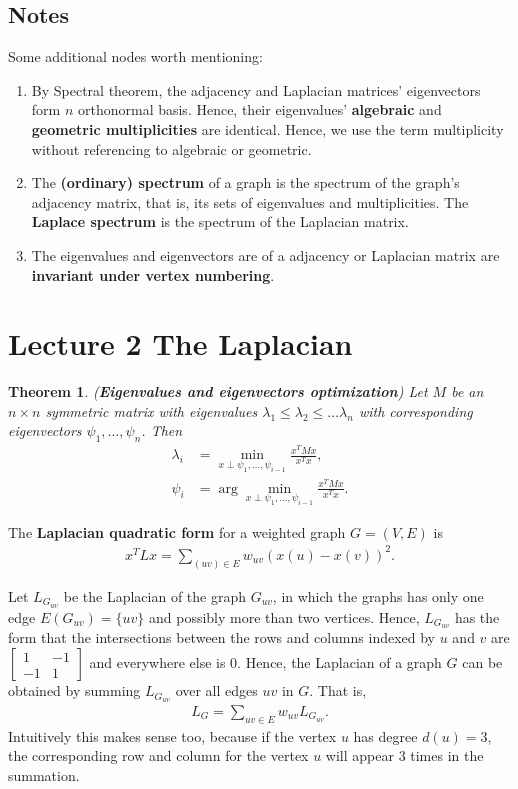 \documentclass[]{article}
\newtheorem{theorem}{Theorem}[section]
\begin{document}
	\subsection{Notes}
	Some additional nodes worth mentioning: 
	
	\begin{enumerate}
		\item By Spectral theorem, the adjacency and Laplacian matrices' eigenvectors form $n$ orthonormal basis. Hence, their eigenvalues' \textbf{algebraic} and \textbf{geometric multiplicities} are identical. Hence, we use the term multiplicity without referencing to algebraic or geometric. 
		\item The \textbf{(ordinary) spectrum} of a graph is the spectrum of the graph's adjacency matrix, that is, its sets of eigenvalues and multiplicities. The \textbf{Laplace spectrum} is the spectrum of the Laplacian matrix. 
		\item The eigenvalues and eigenvectors are of a adjacency or Laplacian matrix are \textbf{invariant under vertex numbering}. 
	\end{enumerate}
	
	\section{Lecture 2 The Laplacian}
	
	\begin{theorem} (\textbf{Eigenvalues and eigenvectors optimization})
		Let $M$ be an $n \times n$ symmetric matrix with eigenvalues $\lambda_1 \le \lambda_2 \le \dots \lambda_n$ with corresponding eigenvectors $\psi_1, \dots, \psi_n$. Then 
		\begin{align*}
		\lambda_i &= \min_{x \perp \psi_1, \dots, \psi_{i-1}} \frac{x^T M x}{x^T x}, \\
		\psi_i &= \arg\min_{x \perp \psi_1, \dots, \psi_{i-1}} \frac{x^T M x}{x^T x}.
		\end{align*}
	\end{theorem}
	
	The \textbf{Laplacian quadratic form} for a weighted graph $G=(V,E)$ is 
	\begin{align}
	\label{equation:laplacian quadratic form}
	x^T L x = \sum_{(uv) \in E} w_{uv} (x(u) - x(v))^2.
	\end{align}
	
	Let $L_{G_{uv}}$ be the Laplacian of the graph $G_{uv}$, in which the graphs has only one edge $E(G_{uv})=\{uv\}$ and possibly more than two vertices. Hence, $L_{G_{uv}}$ has the form that the intersections between the rows and columns indexed by $u$ and $v$ are $\begin{bmatrix}
	1 & -1 \\
	-1 & 1
	\end{bmatrix}$ and everywhere else is $0$. Hence, the Laplacian of a graph $G$ can be obtained by summing $L_{G_{uv}}$ over all edges $uv$ in $G$. That is, 
	\begin{align*}
	L_G = \sum_{uv \in E} w_{uv} L_{G_{uv}}.
	\end{align*}
	Intuitively this makes sense too, because if the vertex $u$ has degree $d(u)=3$, the corresponding row and column for the vertex $u$ will appear $3$ times in the summation. 
	
\end{document}
